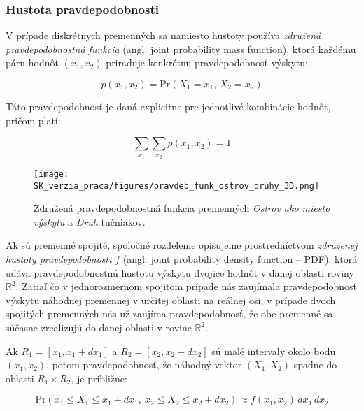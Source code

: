 \subsubsection{Hustota pravdepodobnosti}\label{subsec:joint_pdf}

V prípade diskrétnych premenných sa namiesto hustoty používa \textit{združená pravdepodobnostná funkcia} (angl. joint probability mass function), ktorá každému páru hodnôt $(x_1, x_2)$ priraďuje konkrétnu pravdepodobnosť výskytu: 

\begin{equation}\label{eq:pmf}
p(x_1, x_2) = \mathrm{Pr}(X_1 = x_1,\, X_2 = x_2)
\end{equation}

Táto pravdepodobnosť je daná explicitne pre jednotlivé kombinácie hodnôt, pričom platí:

\begin{equation}
\sum_{x_1} \sum_{x_2} p(x_1, x_2) = 1
\end{equation}

\begin{figure}[H]
    \centering
    \texttt{[image: SK\_verzia\_praca/figures/pravdeb\_funk\_ostrov\_druhy\_3D.png]}
    \caption{Združená pravdepodobnostná funkcia premenných \textit{Ostrov ako miesto výskytu} a \textit{Druh} tučniakov.}
    \label{fig:miesto_druh_joint_density}
\end{figure}

Ak sú premenné spojité, spoločné rozdelenie opisujeme prostredníctvom \textit{združenej hustoty pravdepodobnosti} $f$ (angl. joint probability density function – PDF), ktorá udáva pravdepodobnostnú hustotu výskytu dvojice hodnôt v danej oblasti roviny $\mathbb{R}^2$.
Zatiaľ čo v jednorozmernom spojitom prípade nás zaujímala pravdepodobnosť výskytu náhodnej premennej v určitej oblasti na reálnej osi, v prípade dvoch spojitých premenných nás už zaujíma pravdepodobnosť, že obe premenné sa súčasne zrealizujú do danej oblasti v rovine $\mathbb{R}^2$.

Ak $R_1 = [x_1, x_1 + dx_1]$ a $R_2 = [x_2, x_2 + dx_2]$ sú malé intervaly okolo bodu $(x_1, x_2)$, potom pravdepodobnosť, že náhodný vektor $(X_1, X_2)$ spadne do oblasti $R_1 \times R_2$, je približne:

\begin{equation}
\mathrm{Pr}(x_1 \leq X_1 \leq x_1 + dx_1,\ x_2 \leq X_2 \leq x_2 + dx_2) \approx f(x_1, x_2) \, dx_1 \, dx_2
\end{equation}

